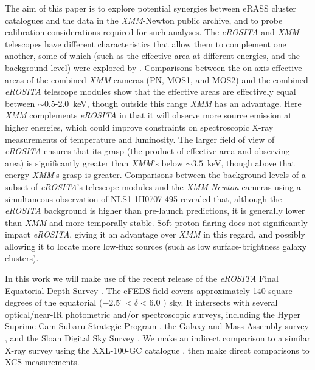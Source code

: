 \documentclass[fleqn,usenatbib]{mnras}
\begin{document}
The aim of this paper is to explore potential synergies between eRASS cluster catalogues and the data in the {\em XMM}-Newton public archive, and to probe calibration considerations required for such analyses. The {\em eROSITA} and {\em XMM} telescopes have different characteristics that allow them to complement one another, some of which (such as the effective area at different energies, and the background level) were explored by \cite{missionpaper}. Comparisons between the on-axis effective areas of the combined {\em XMM} cameras (PN, MOS1, and MOS2) and the combined {\em eROSITA} telescope modules show that the effective areas are effectively equal between ${\sim}$0.5-2.0~keV, though outside this range {\em XMM} has an advantage. Here {\em XMM} complements {\em eROSITA} in that it will observe more source emission at higher energies, which could improve constraints on spectroscopic X-ray measurements of temperature and luminosity. The larger field of view of {\em eROSITA} ensures that its grasp (the product of effective area and observing area) is significantly greater than {\em XMM}'s below ${\sim}3.5$~keV, though above that energy {\em XMM}'s grasp is greater. Comparisons between the background levels of a subset of {\em eROSITA}'s telescope modules and the {\em XMM-Newton} cameras using a simultaneous observation of NLS1 1H0707-495 \citep[][]{simulback} revealed that, although the {\em eROSITA} background is higher than pre-launch predictions, it is generally lower than {\em XMM} and more temporally stable. Soft-proton flaring does not significantly impact {\em eROSITA}, giving it an advantage over {\em XMM} in this regard, and possibly allowing it to locate more low-flux sources (such as low surface-brightness galaxy clusters).

In this work we will make use of the recent release of the {\em eROSITA} Final Equatorial-Depth Survey \citep[eFEDS,][]{efedscat}. The eFEDS field covers approximately 140 square degrees of the equatorial ($-2.5^{\circ}<\delta<6.0^{\circ}$) sky. It intersects with several optical/near-IR photometric and/or spectroscopic surveys, including the Hyper Suprime-Cam Subaru Strategic Program \citep[HSC SSP,][]{hscsurvey}, the Galaxy and Mass Assembly survey \citep[GAMA,][]{gamasurvey}, and the Sloan Digital Sky Survey \citep[SDSS,][]{sdss}. We make an indirect comparison to a similar X-ray survey using the XXL-100-GC catalogue \citep[][]{xxlgc100}, then make direct comparisons to XCS measurements.
\end{document}
